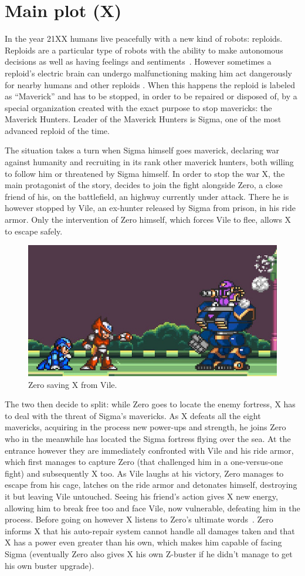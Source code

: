\section[Main plot]{Main plot (X)}
In the year 21XX humans live peacefully with a new kind of robots: reploids. Reploids are a particular type of robots with the ability to make autonomous decisions as well as having feelings and sentiments~\cite{Xcoll1:Manual_X1}. However sometimes  a reploid's electric brain can undergo  malfunctioning making him act dangerously for nearby humans and other reploids . When this happens the reploid is labeled as ``Maverick'' and has to be stopped, in order to be repaired or disposed of, by a special organization created with the exact purpose to stop mavericks: the Maverick Hunters. Leader of the Maverick Hunters is Sigma, one of the most advanced reploid of the time. 

The situation takes a turn when Sigma himself goes maverick, declaring war against humanity and recruiting in its rank other maverick hunters, both willing to follow him or threatened by Sigma himself. In order to stop the war X, the main protagonist of the story, decides to join the fight alongside Zero, a close friend of his, on the battlefield, an highway currently under attack. There he is however stopped by Vile, an ex-hunter released by Sigma from prison, in his ride armor. Only the intervention of Zero himself, which forces Vile to flee, allows X to escape safely.
\begin{figure}[htp]
	\centering
	\includegraphics[width=0.5\linewidth]{figures/X1/Highway_end.jpg}
	\caption{Zero saving X from Vile.}
\end{figure}

The two then decide to split: while Zero goes to locate the enemy fortress, X has to deal with the threat of Sigma's mavericks. As X defeats all the eight mavericks, acquiring in the process new power-ups and strength, he joins Zero who in the meanwhile has located the Sigma fortress flying over the sea. At the entrance however they are immediately confronted with Vile and his ride armor, which first manages to capture Zero (that challenged him in a one-versus-one fight) and subsequently X too. As Vile laughs at his victory, Zero manages to escape from his cage, latches on the ride armor and detonates himself, destroying it but leaving Vile untouched. Seeing his friend's action gives X new energy, allowing him to break free too and face Vile, now vulnerable, defeating him in the process. Before going on however X listens to Zero's ultimate words~\cite{wiki:MMX_script}. Zero informs X that his auto-repair system cannot handle all damages taken and that X has a power even greater than his own, which makes him capable of facing Sigma (eventually Zero also gives X his own Z-buster if he didn't manage to get his own buster upgrade).

